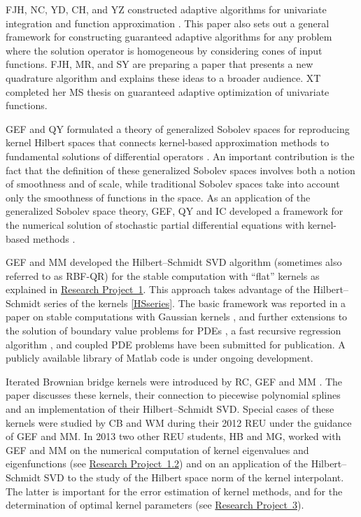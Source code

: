 \documentclass[11pt]{NSFamsart}
\newcommand{\Matlab}{{\sc Matlab}\xspace}
\newcommand{\refproba}{\hyperref[SectHSSVD]{Research Project~1}\xspace}
\newcommand{\refprobab}{\hyperref[NumerEigensubsec]{Research Project~1.2}\xspace}
\newcommand{\refprobc}{\hyperref[combinesec]{Research Project~3}\xspace}
\begin{document}
FJH, NC, YD, CH, and YZ constructed adaptive algorithms for univariate integration and function approximation \citep{HicEtal14b}.  This paper also sets out a general framework for constructing guaranteed adaptive algorithms for any problem where the solution operator is homogeneous by considering cones of input functions.  FJH, MR, and SY are preparing a paper that presents a new quadrature algorithm and explains these ideas to a broader audience.  XT completed her MS thesis \citep{Ton14a} on guaranteed adaptive optimization of univariate functions.

GEF and QY formulated a theory of generalized Sobolev spaces for reproducing kernel Hilbert spaces that connects kernel-based approximation methods to fundamental solutions of differential operators \cite{FasshauerYe11, FasshauerYe13}. An important contribution is the fact that the definition of these generalized Sobolev spaces involves both a notion of smoothness and of scale, while traditional Sobolev spaces take into account only the smoothness of functions in the space.
As an application of the generalized Sobolev space theory, GEF, QY and IC developed a framework for the numerical solution of stochastic partial differential equations with kernel-based methods \citep{CFY12,FasshauerYe13b,FasshauerYe14}.

GEF and MM developed the Hilbert--Schmidt SVD algorithm (sometimes also referred to as RBF-QR) for the stable computation with ``flat'' kernels as explained in \refproba. This approach takes advantage of the Hilbert--Schmidt series of the kernels \eqref{HSseries}. The basic framework was reported in a paper on stable computations with Gaussian kernels \citep{FMcC12}, and further extensions to the solution of boundary value problems for PDEs \citep{McCourt13}, a fast recursive regression algorithm \citep{McCourt13b}, and coupled PDE problems \citep{McCF14} have been submitted for publication. A publicly available library of \Matlab code \citep{McCFBG13} is under ongoing development.

Iterated Brownian bridge kernels were introduced by RC, GEF and MM \citep{CavorettoEtAl14}. The paper discusses these kernels, their connection to piecewise polynomial splines and an implementation of their Hilbert--Schmidt SVD. Special cases of these kernels were studied by CB and WM during their 2012 REU under the guidance of GEF and MM. In 2013 two other REU students, HB and MG, worked with GEF and MM on the numerical computation of kernel eigenvalues and eigenfunctions (see \refprobab) and on an application of the Hilbert--Schmidt SVD to the study of the Hilbert space norm of the kernel interpolant. The latter is important for the error estimation of kernel methods, and for the determination of optimal kernel parameters (see \refprobc).
\end{document}
